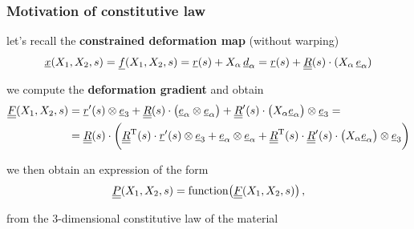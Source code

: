 \begin{frame}
  \frametitle{Motivation of constitutive law}

  let's recall the \textbf{constrained deformation map} (without warping)
  \begin{displaymath}
    \underline{x}(X_1,X_2,s) = \underline{f}(X_1,X_2,s) = \underline{r}(s) + X_{\alpha} \, \underline{d}_{\alpha} = \underline{r}(s) + \underline{\underline{R}}(s) \cdot ( X_{\alpha} \, \underline{e}_{\alpha} )
  \end{displaymath}
  
  we compute the \textbf{deformation gradient} and obtain
  \begin{displaymath}
    \begin{alignedat}{1}
      \underline{\underline{F}}(X_1,X_2,s) &= \underline{r}^{\prime}(s) \otimes \underline{e}_3 + \underline{\underline{R}}(s) \cdot \bigl( \underline{e}_{\alpha} \otimes \underline{e}_{\alpha} \bigr) + \underline{\underline{R}}^{\prime}(s) \cdot \bigl( X_{\alpha} \underline{e}_{\alpha} \bigr) \otimes \underline{e}_3 = \\
      &= \underline{\underline{R}}(s) \cdot \biggl( \underline{\underline{R}}^{\mathrm{T}}(s) \cdot \underline{r}^{\prime}(s) \otimes \underline{e}_3 + \underline{e}_{\alpha} \otimes \underline{e}_{\alpha} + \underline{\underline{R}}^{\mathrm{T}}(s) \cdot \underline{\underline{R}}^{\prime}(s) \cdot \bigl( X_{\alpha} \underline{e}_{\alpha} \bigr) \otimes \underline{e}_3 \biggr)
    \end{alignedat}
  \end{displaymath}
  
  \vspace{1em}
  we then obtain an expression of the form
  \begin{displaymath}
    \underline{\underline{P}}(X_1,X_2,s) = \mathop{\mathrm{function}}\bigl( \underline{\underline{F}}(X_1,X_2,s) \bigr) \, ,
  \end{displaymath}
  
  \vspace{0.4em}
  from the 3-dimensional constitutive law of the material
\end{frame}



